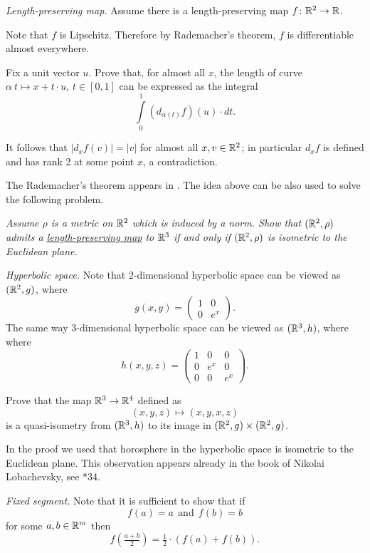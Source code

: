 \textit{Length-preserving map.}
Assume there is a length-preserving map $f\colon\mathbb{R}^2\to \mathbb{R}$.

Note that $f$ is Lipschitz.
Therefore by Rademacher's theorem, $f$ is differentiable almost everywhere.

Fix a unit vector $u$.
Prove that, for almost all $x$, the length of curve 
$\alpha\:t\mapsto x+t\cdot u$, $t\in[0,1]$ can be expressed as the integral
\[\int\limits_0^1 (d_{\alpha(t)}f)(u) \cdot dt.\]

It follows that $|d_xf(v)|=|v|$ for almost all $x,v\in\mathbb{R}^2$;
in particular $d_xf$ is defined and has rank 2 at some point $x$, a contradiction.  

 The Rademacher's theorem appears in \cite{rademacher}.
The idea above can be also used to solve the following problem.

{\it Assume $\rho$ is a metric on $\mathbb{R}^2$ 
which is induced by a norm.
Show that $(\mathbb{R}^2,\rho)$ admits 
a \hyperref[Length-preserving map]{\emph{length-preserving map}} 
to $\mathbb{R}^3$ 
if and only if 
$(\mathbb{R}^2,\rho)$ is isometric to the Euclidean plane.}



\textit{Hyperbolic space.}
Note that $2$-dimensional hyperbolic space 
can be viewed as $(\mathbb{R}^2,g)$, where 
\[g(x,y)=\left(\begin{matrix}
     1&0
     \\
     0&e^{x}
    \end{matrix}\right).\]
The same way $3$-dimensional hyperbolic space 
can be viewed as $(\mathbb{R}^3,h)$, where 
where 
\[h(x,y,z)=\left(\begin{matrix}
     1&0&0
     \\
     0&e^{x}&0
     \\
     0&0&e^{x}
    \end{matrix}\right).\]

Prove that the map $\mathbb{R}^3\to \mathbb{R}^4$ defined as
$$(x,y,z)\mapsto (x,y,x,z)$$
is a quasi-isometry from $(\mathbb{R}^3,h)$ to its image in $(\mathbb{R}^2,g)\times (\mathbb{R}^2,g)$.

In the proof we used that horosphere in the hyperbolic space is isometric to the Euclidean plane.
This observation appears already in the book of Nikolai Lobachevsky, see \cite{lobachevsky}*{34}.



\textit{Fixed segment.}
Note that it is sufficient to show that if 
\[f(a)=a\ \ \text{and}\ \ f(b)=b\]
for some $a,b\in\mathbb{R}^m$
then 
\[f(\tfrac{a+b}2)=\tfrac12\cdot(f(a)+f(b)).\]

